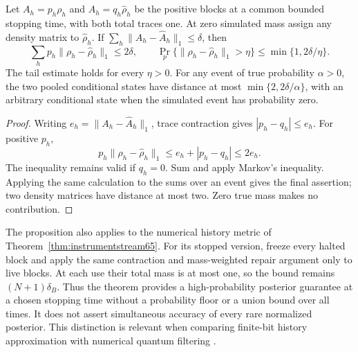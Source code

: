 \begin{proposition}\label{prop:posterior66}
Let $A_h=p_h\rho_h$ and $\widehat A_h=q_h\widehat\rho_h$ be the
positive blocks at a common bounded stopping time, with both total
traces one. At zero simulated mass assign any density matrix to
$\widehat\rho_h$. If
$\sum_h\|A_h-\widehat A_h\|_1\le\delta$, then
\begin{equation}\label{eq:posterior66}
 \sum_h p_h\|\rho_h-\widehat\rho_h\|_1\le2\delta,\qquad
 \Pr_p\{\|\rho_h-\widehat\rho_h\|_1>\eta\}
                              \le\min\{1,2\delta/\eta\}.
\end{equation}
The tail estimate holds for every $\eta>0$. For any event of true probability $\alpha>0$, the two pooled
conditional states have distance at most $\min\{2,2\delta/\alpha\}$,
with an arbitrary conditional state when the simulated event has
probability zero.
\end{proposition}
\begin{proof}
Writing $e_h=\|A_h-\widehat A_h\|_1$, trace contraction gives
$|p_h-q_h|\le e_h$. For positive $p_h$,
\[
 p_h\|\rho_h-\widehat\rho_h\|_1
 \le e_h+|p_h-q_h|\le2e_h.
\]
The inequality remains valid if $q_h=0$. Sum and apply Markov's
inequality. Applying the same calculation to the sums over an event
gives the final assertion; two density matrices have distance at most
two. Zero true mass makes no contribution.
\end{proof}
The proposition also applies to the numerical history metric of
Theorem~\ref{thm:instrumentstream65}. For its stopped version, freeze
every halted block and apply the same contraction and mass-weighted
repair argument only to live blocks. At each use their total mass is
at most one, so the bound remains $(N+1)\delta_B$. Thus the theorem
provides a high-probability posterior guarantee at a chosen stopping
time without a probability floor or a union bound over all times.
It does not assert simultaneous accuracy of every rare normalized
posterior. This distinction is relevant when comparing finite-bit
history approximation with numerical quantum filtering
\cite[Section~II, equations~(10)--(13)]{RouchonRalph66}.
